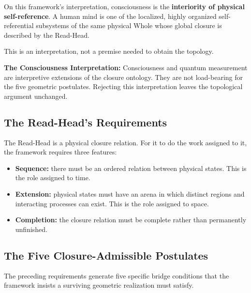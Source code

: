 \documentclass[11pt]{article}
\theoremstyle{canonstyle}
\begin{document}
On this framework's interpretation, consciousness is the \textbf{interiority of physical self-reference}. A human mind is one of the localized, highly organized self-referential subsystems of the same physical Whole whose global closure is described by the Read-Head.

This is an interpretation, not a premise needed to obtain the topology.

\begin{keyresult}
\textbf{The Consciousness Interpretation:} Consciousness and quantum measurement are interpretive extensions of the closure ontology. They are not load-bearing for the five geometric postulates. Rejecting this interpretation leaves the topological argument unchanged.
\end{keyresult}

\subsection{The Read-Head's Requirements}

The Read-Head is a physical closure relation. For it to do the work assigned to it, the framework requires three features:
\begin{itemize}
    \item \textbf{Sequence:} there must be an ordered relation between physical states. This is the role assigned to time.
    \item \textbf{Extension:} physical states must have an arena in which distinct regions and interacting processes can exist. This is the role assigned to space.
    \item \textbf{Completion:} the closure relation must be complete rather than permanently unfinished.
\end{itemize}

\subsection{The Five Closure-Admissible Postulates}

The preceding requirements generate five specific bridge conditions that the framework insists a surviving geometric realization must satisfy.
\end{document}
